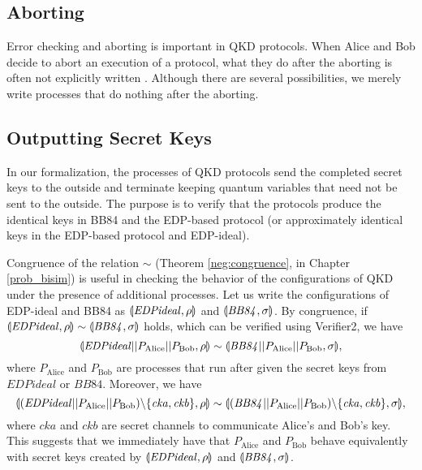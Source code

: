 \subsection*{Aborting}
Error checking and aborting is important in QKD protocols.
When Alice and Bob decide to abort an execution of a protocol, what they
do after the aborting is often not explicitly written
\cite{BennetBrassard1984, ShorPreskill2000}.
Although there are several possibilities, we merely write
processes that do nothing after the aborting.

\subsection*{Outputting Secret Keys}
\label{fml:outputtingsks}
In our formalization, the processes of QKD protocols 
send the completed secret keys
to the outside and terminate keeping quantum variables
that need not be sent to the outside.
The purpose is to verify that
the protocols produce the identical keys in BB84 and the EDP-based
protocol (or approximately identical keys in the EDP-based protocol and
EDP-ideal).

Congruence of the relation $\sim$
(Theorem \ref{neg:congruence}, in Chapter \ref{prob_bisim}) is 
useful in checking the behavior of the configurations of QKD under the presence
of additional processes.
Let us write 
the configurations of EDP-ideal and BB84 as
$\llparenthesis \mathit{EDPideal}, \rho \rrparenthesis$ and $\llparenthesis \mathit{BB84}, \sigma \rrparenthesis$.
By congruence, if
$\llparenthesis \mathit{EDPideal}, \rho \rrparenthesis \sim
\llparenthesis \mathit{BB84}, \sigma \rrparenthesis$ holds, which can be verified using
Verifier2, we have
\[
 \llparenthesis \mathit{EDPideal}||
P_{\mathrm{Alice}}||
P_{\mathrm{Bob}}
, \rho \rrparenthesis \sim
 \llparenthesis \mathit{BB84}||
P_{\mathrm{Alice}}||
P_{\mathrm{Bob}}
, \sigma \rrparenthesis,
\]
where $P_{\mathrm{Alice}}$ and $P_{\mathrm{Bob}}$
are processes that run after given the secret keys from
$\mathit{EDPideal}$ or $\mathit{BB84}$.
Moreover, we have
\[
 \llparenthesis (\mathit{EDPideal}||
P_{\mathrm{Alice}}||
P_{\mathrm{Bob}})\backslash \{\mathit{cka}, \mathit{ckb}\}
, \rho \rrparenthesis \sim
 \llparenthesis (\mathit{BB84}||
P_{\mathrm{Alice}}||
P_{\mathrm{Bob}})\backslash \{\mathit{cka}, \mathit{ckb}\}
, \sigma \rrparenthesis,\]
where $\mathit{cka}$ and $\mathit{ckb}$ are
secret channels to communicate Alice's and Bob's key.
This suggests that we immediately have that
$P_{\mathrm{Alice}}$ and $P_{\mathrm{Bob}}$ behave equivalently
with secret keys created by $\llparenthesis \mathit{EDPideal}, \rho \rrparenthesis$ and
$\llparenthesis \mathit{BB84}, \sigma \rrparenthesis$.

